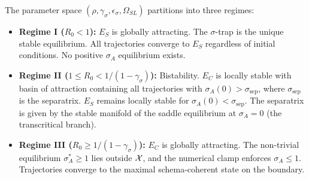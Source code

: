\begin{theorem}
\label{thm:stability-landscape}
The parameter space $(\rho, \gamma_\sigma, \epsilon_\sigma, \Omega_{SL})$
partitions into three regimes:
\begin{itemize}
\item \textbf{Regime I ($R_0 < 1$):} $E_S$ is globally attracting.
  The $\sigma$-trap is the unique stable equilibrium. All trajectories
  converge to $E_S$ regardless of initial conditions. No positive
  $\sigma_A$ equilibrium exists.
\item \textbf{Regime II ($1 \leq R_0 < 1/(1 - \gamma_\sigma)$):}
  Bistability. $E_C$ is locally stable with basin of attraction
  containing all trajectories with $\sigma_A(0) > \sigma_{\mathrm{sep}}$,
  where $\sigma_{\mathrm{sep}}$ is the separatrix. $E_S$ remains
  locally stable for $\sigma_A(0) < \sigma_{\mathrm{sep}}$.
  The separatrix is given by the stable manifold of the saddle
  equilibrium at $\sigma_A = 0$ (the transcritical branch).
\item \textbf{Regime III ($R_0 \geq 1/(1 - \gamma_\sigma)$):}
  $E_C$ is globally attracting. The non-trivial equilibrium
  $\sigma^*_A \geq 1$ lies outside $\mathcal{X}$, and the numerical clamp enforces
  $\sigma_A \leq 1$. Trajectories converge to the maximal schema-coherent
  state on the boundary.
\end{itemize}
\end{theorem}

